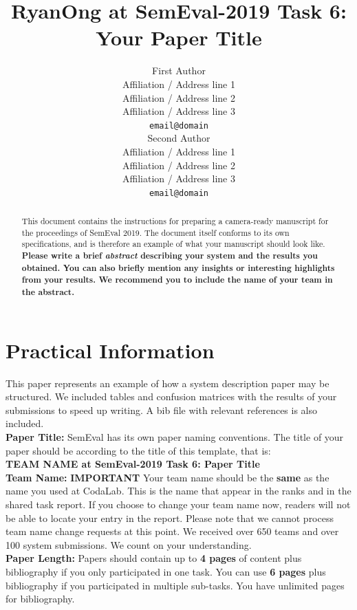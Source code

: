 \documentclass[11pt,a4paper]{article}
\title{RyanOng at SemEval-2019 Task 6: Your Paper Title}
\author{First Author \\
  Affiliation / Address line 1 \\
  Affiliation / Address line 2 \\
  Affiliation / Address line 3 \\
  {\tt email@domain} \\\And
  Second Author \\
  Affiliation / Address line 1 \\
  Affiliation / Address line 2 \\
  Affiliation / Address line 3 \\
  {\tt email@domain} \\}
\date{}
\begin{document}
\maketitle
\begin{abstract}
This document contains the instructions for preparing a camera-ready manuscript for the proceedings of SemEval 2019.
%
The document itself conforms to its own specifications, and is therefore an example of what your manuscript should look like.
%
\bf Please write a brief \emph{abstract} describing your system and the results you obtained. You can also briefly mention any insights or interesting highlights from your results. We recommend you to include the name of your team in the abstract.
\end{abstract}

\section*{Practical Information}

This paper represents an example of how a system description paper may be structured. We included tables and confusion matrices with the results of your submissions to speed up writing. A bib file with relevant references is also included.
\\

{\bf Paper Title:} SemEval has its own paper naming conventions. The title of your paper should be according to the title of this template, that is:\\

{\bf TEAM NAME at SemEval-2019 Task 6: Paper Title} 
\\

{\bf Team Name:} {\bf IMPORTANT} Your team name should be the {\bf same} as the name you used at CodaLab.  This is the name that appear in the ranks and in the shared task report. If you choose to change your team name now, readers will not be able to locate your entry in the report. Please note that we cannot process team name change requests at this point. We received over 650 teams and over 100 system submissions. We count on your understanding.
\\

{\bf Paper Length:} Papers should contain up to {\bf 4 pages} of content plus bibliography if you only participated in one task. You can use {\bf 6 pages}  plus bibliography if you participated in multiple sub-tasks. You have unlimited pages for bibliography.
\\
\end{document}
